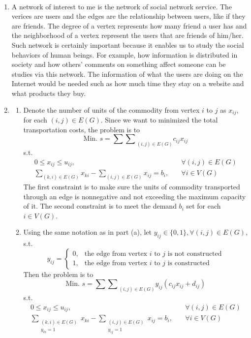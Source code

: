 \documentclass[10pt]{report}
\title{
	\courseTitle\\
	\hwNo\\
	\hwDate
}
\author{\hwAuther}
\date{}
\begin{document}
\maketitle

\begin{enumerate}
	\item 
	A network of interest to me is the network of social network service. The verices are users and the edges are the relationship between users, like if they are friends. The degree of a vertex represents how many friend a user has and the neighborhood of a vertex represent the users that are friends of him/her. Such network is certainly important because it enables us to study the social behaviors of human beings. For example, how information is distributed in society and how others' comments on something affect someone can be studies via this network. The information of what the users are doing on the Internet would be needed such as how much time they stay on a website and what products they buy. 
	
	\item 
	\begin{enumerate}
		\item 
		Denote the number of units of the commodity from vertex $i$ to $j$ as $x_{ij}$, for each $(i, j)\in E(G)$. Since we want to minimized the total transportation costs, the problem is to
		\[
		\text{Min. } s = {\sum\sum}_{(i,j)\in E(G)} c_{ij} x_{ij}
		\]
		s.t.
		\begin{align*}
			0\le x_{ij} \le u_{ij},& \quad \forall (i, j)\in E(G)\\
			\sum_{(k, i)\in E(G)} x_{ki} - \sum_{(i, j)\in E(G)} x_{ij} = b_i,& \quad \forall i\in V(G)
		\end{align*}
		The first constraint is to make sure the units of commodity transported through an edge is nonnegative and not exceeding the maximum capacity of it. The second constraint is to meet the demand $b_i$ set for each $i\in V(G)$.
		
		\item 
		Using the same notation as in part (a), let $y_{ij} \in \{0,1\}, \forall (i, j) \in E(G)$, s.t.
		\[
		y_{ij} = 
		\begin{cases}
			0, & \text{the edge from vertex $i$ to $j$ is not constructed}\\
			1, & \text{the edge from vertex $i$ to $j$ is constructed}
		\end{cases}
		\]
		Then the problem is to
		\[
		\text{Min. } s = {\sum\sum}_{(i,j)\in E(G)} y_{ij} (c_{ij} x_{ij} + d_{ij})
		\]
		s.t.
		\begin{align*}
			0\le x_{ij} \le u_{ij},& \quad \forall (i, j)\in E(G)\\
			\sum_{\substack{(k, i)\in E(G) \\ y_{ki}=1}} x_{ki} - \sum_{\substack{(i, j)\in E(G) \\ y_{ij}=1}} x_{ij} = b_i,& \quad \forall i\in V(G)
		\end{align*}
	\end{enumerate}


\end{enumerate}
\end{document}
